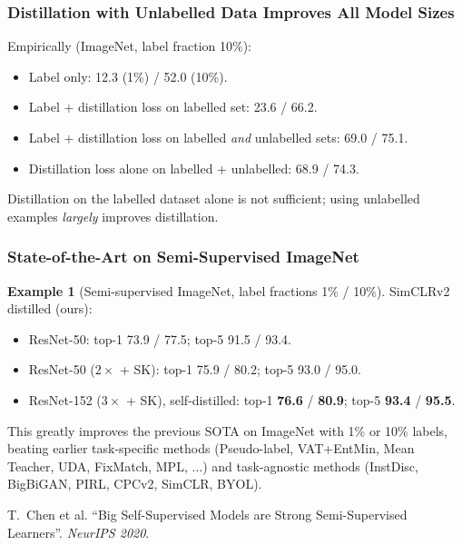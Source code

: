 \documentclass[11pt,a4paper]{article}
\theoremstyle{definition}
\newtheorem{example}{Example}[section]
\theoremstyle{plain}
\theoremstyle{remark}
\begin{document}
\subsubsection{Distillation with Unlabelled Data Improves All Model Sizes}

Empirically (ImageNet, label fraction 10\%):
\begin{itemize}
    \item Label only: 12.3 (1\%) / 52.0 (10\%).
    \item Label + distillation loss on labelled set: 23.6 / 66.2.
    \item Label + distillation loss on labelled \emph{and} unlabelled sets: 69.0 / 75.1.
    \item Distillation loss alone on labelled + unlabelled: 68.9 / 74.3.
\end{itemize}
Distillation on the labelled dataset alone is not sufficient; using unlabelled examples \emph{largely} improves distillation.

\subsubsection{State-of-the-Art on Semi-Supervised ImageNet}

\begin{example}[Semi-supervised ImageNet, label fractions 1\% / 10\%]
SimCLRv2 distilled (ours):
\begin{itemize}[leftmargin=*]
    \item ResNet-50: top-1 73.9 / 77.5; top-5 91.5 / 93.4.
    \item ResNet-50 ($2\times$ + SK): top-1 75.9 / 80.2; top-5 93.0 / 95.0.
    \item ResNet-152 ($3\times$ + SK), self-distilled: top-1 \textbf{76.6} / \textbf{80.9}; top-5 \textbf{93.4} / \textbf{95.5}.
\end{itemize}
This greatly improves the previous SOTA on ImageNet with 1\% or 10\% labels, beating earlier task-specific methods (Pseudo-label, VAT+EntMin, Mean Teacher, UDA, FixMatch, MPL, $\ldots$) and task-agnostic methods (InstDisc, BigBiGAN, PIRL, CPCv2, SimCLR, BYOL).
\end{example}

\begin{tcolorbox}[colback=blue!5!white,colframe=blue!60!black,title={Reference}]
T.\ Chen et al. ``Big Self-Supervised Models are Strong Semi-Supervised Learners''. \textit{NeurIPS 2020}.
\end{tcolorbox}
\end{document}
